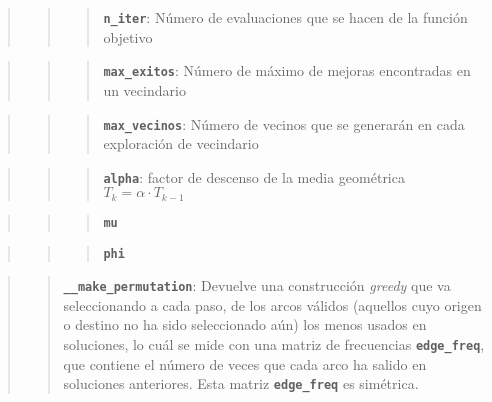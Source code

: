 \documentclass{article}
\begin{document}
\begin{quote}
\begin{quote}
\begin{quote}
\textbf{\texttt{n\_iter}}: Número de evaluaciones que se hacen de la
función objetivo
\end{quote}
\end{quote}
\end{quote}

\begin{quote}
\begin{quote}
\begin{quote}
\textbf{\texttt{max\_exitos}}: Número de máximo de mejoras encontradas
en un vecindario
\end{quote}
\end{quote}
\end{quote}

\begin{quote}
\begin{quote}
\begin{quote}
\textbf{\texttt{max\_vecinos}}: Número de vecinos que se generarán en
cada exploración de vecindario
\end{quote}
\end{quote}
\end{quote}

\begin{quote}
\begin{quote}
\begin{quote}
\textbf{\texttt{alpha}}: factor de descenso de la media geométrica
$T_k = \alpha \cdot T_{k-1}$
\end{quote}
\end{quote}
\end{quote}

\begin{quote}
\begin{quote}
\begin{quote}
\textbf{\texttt{mu}}
\end{quote}
\end{quote}
\end{quote}

\begin{quote}
\begin{quote}
\begin{quote}
\textbf{\texttt{phi}}
\end{quote}
\end{quote}
\end{quote}

\begin{quote}
\begin{quote}
\textbf{\texttt{\_\_make\_permutation}}:  Devuelve una
construcción \emph{greedy} que va seleccionando a cada paso, de los
arcos válidos (aquellos cuyo origen o destino no ha sido seleccionado
aún) los menos usados en soluciones, lo cuál se mide con una matriz de
frecuencias \textbf{\texttt{edge\_freq}}, que contiene el número de
veces que cada arco ha salido en soluciones anteriores. Esta matriz
\textbf{\texttt{edge\_freq}} es simétrica.
\end{quote}
\end{quote}
\end{document}
